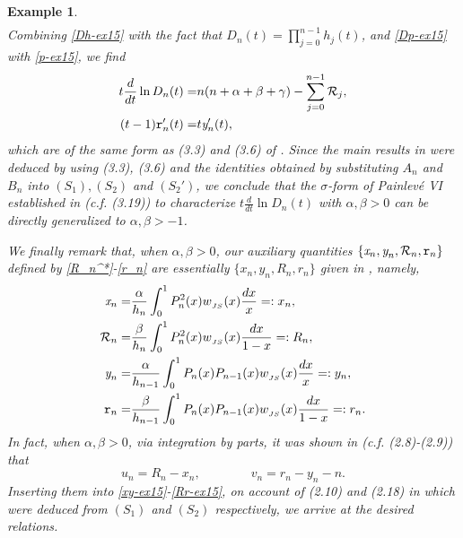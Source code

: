 \documentclass[12pt,a4paper]{article}    %
\newtheorem{exm}{Example}
\numberwithin{equation}{section}
\begin{document}
\begin{exm}
\begin{align}
\end{align}
Combining \eqref{Dh-ex15} with the fact that $D_n(t)=\prod_{j=0}^{n-1}h_j(t)$, and \eqref{Dp-ex15} with \eqref{p-ex15}, we find
\begin{align}
t\frac{d}{dt}\ln D_n(t)=&n(n+\alpha+\beta+\gamma)-\sum_{j=0}^{n-1}\mathcal{R}_j,\\
(t-1)\texttt{r}_n'(t) =&t\emph{y}_n'(t),
\end{align}
which are of the same form as (3.3) and (3.6) of \cite{MinChenMMAS}.
Since the main results in \cite{MinChenMMAS} were deduced by using (3.3), (3.6) and the identities obtained by substituting $A_n$ and $B_n$ into $(S_1), (S_2)$ and $(S_2')$, we conclude that the $\sigma$-form of Painlev\'{e} VI established in  \cite{MinChenMMAS} (c.f. (3.19)) to characterize $t\frac{d}{dt}\ln D_n(t)$ with $\alpha,\beta>0$ can be directly generalized to $\alpha,\beta>-1$.

We finally remark that, when $\alpha,\beta>0$,
our auxiliary quantities $\{\emph{x}_n,\emph{y}_n,\mathcal{R}_n,\texttt{r}_n\}$ defined by \eqref{R_n^*}-\eqref{r_n} are essentially $\{x_n, y_n,R_n,r_n\}$ given in \cite{MinChenMMAS}, namely,
\begin{align*}
\emph{x}_n=&\frac{\alpha}{h_n}\int_0^1P_n^2(x)w_{_{JS}}(x)\frac{dx}{x}=:x_n,\\
\mathcal{R}_n=&\frac{\beta}{h_n}\int_0^1P_n^2(x)w_{_{JS}}(x)\frac{dx}{1-x}=:R_n,\\
\emph{y}_n=&\frac{\alpha}{h_{n-1}}\int_0^1P_n(x)P_{n-1}(x)w_{_{JS}}(x)\frac{dx}{x}=:y_n,\\
\texttt{r}_n=&\frac{\beta}{h_{n-1}}\int_0^1P_n(x)P_{n-1}(x)w_{_{JS}}(x)\frac{dx}{1-x}=:r_n.
\end{align*}
In fact, when $\alpha,\beta>0$, via integration by parts, it was shown in \cite{MinChenMMAS}  (c.f. (2.8)-(2.9)) that
\[u_n=R_n-x_n,\qquad\qquad v_n=r_n-y_n-n.\]
Inserting them into \eqref{xy-ex15}-\eqref{Rr-ex15}, on account of (2.10) and (2.18) in \cite{MinChenMMAS}  which were deduced from $(S_1)$ and $(S_2)$ respectively,  we arrive at the desired relations.
\end{exm}
		
\end{document}
